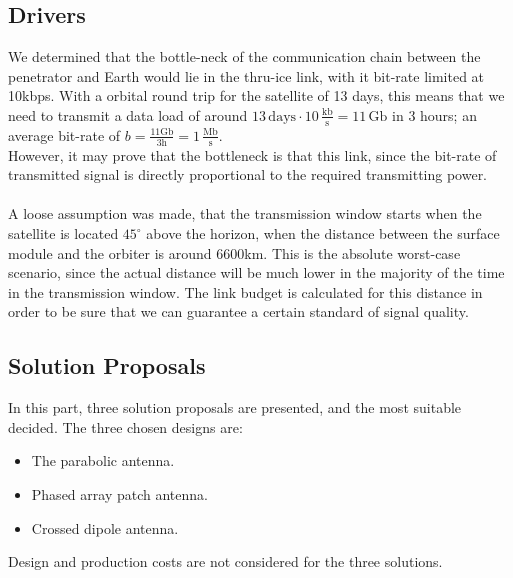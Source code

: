 \subsection{Drivers}
We determined that the bottle-neck of the communication chain between the penetrator and Earth would lie in the thru-ice link, with it bit-rate limited at 10kbps. With a orbital round trip for the satellite of 13 days, this means that we need to transmit a data load of around $13\,\mathrm{days}\cdot 10\, \mathrm{\frac{kb}{s}}=11\,\mathrm{Gb}$ in 3 hours; an average bit-rate of $b=\frac{11\mathrm{Gb}}{3\mathrm{h}}=1\,\mathrm{\frac{Mb}{s}}$.\\
However, it may prove that the bottleneck is that this link, since the bit-rate of transmitted signal is directly proportional to the required transmitting power.\\
\\
A loose assumption was made, that the transmission window starts when the satellite is located $45^\circ$ above the horizon, when the distance between the surface module and the orbiter is around 6600km. This is the absolute worst-case scenario, since the actual distance will be much lower in the majority of the time in the transmission window. The link budget is calculated for this distance in order to be sure that we can guarantee a certain standard of signal quality.
\subsection{Solution Proposals}
In this part, three solution proposals are presented, and the most suitable decided. The three chosen designs are:
\begin{itemize}
\item The parabolic antenna.
\item Phased array patch antenna.
\item Crossed dipole antenna. 
\end{itemize}
Design and production costs are not considered for the three solutions. 
